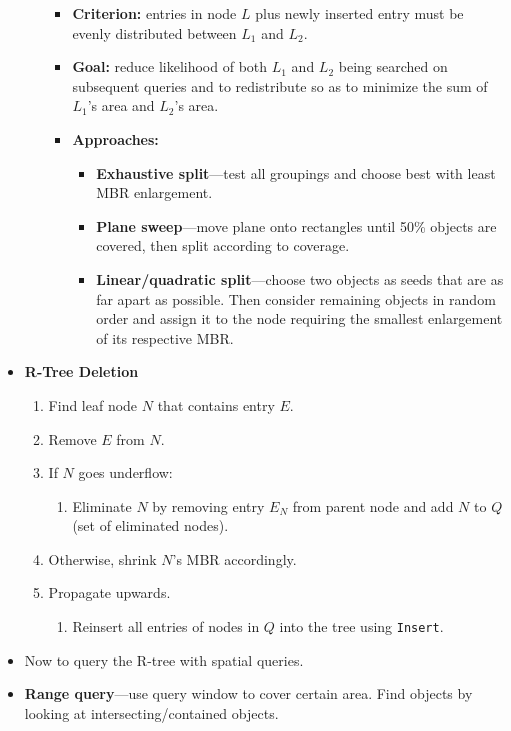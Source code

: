 \begin{multicols}{2}
\begin{itemize}
\begin{itemize}
    \begin{itemize}
        \item
      \textbf{Criterion:} entries in node \(L\) plus newly inserted
      entry must be evenly distributed between \(L_{1}\) and \(L_{2}\).
    \item
      \textbf{Goal:} reduce likelihood of both \(L_{1}\) and \(L_{2}\)
      being searched on subsequent queries and to redistribute so as to
      minimize the sum of \(L_{1}\)'s area and \(L_{2}\)'s area.
    \item
      \textbf{Approaches:}

      \begin{itemize}
            \item
        \textbf{Exhaustive split}---test all groupings and choose best
        with least MBR enlargement.
      \item
        \textbf{Plane sweep}---move plane onto rectangles until 50\%
        objects are covered, then split according to coverage.
      \item
        \textbf{Linear/quadratic split}---choose two objects as seeds
        that are as far apart as possible. Then consider remaining
        objects in random order and assign it to the node requiring the
        smallest enlargement of its respective MBR.
      \end{itemize}
    \end{itemize}
  \end{itemize}
\item
  \textbf{R-Tree Deletion}

  \begin{enumerate}
  \def\labelenumi{\arabic{enumi}.}
    \item
    Find leaf node \(N\) that contains entry \(E\).
  \item
    Remove \(E\) from \(N\).
  \item
    If \(N\) goes underflow:

    \begin{enumerate}
    \def\labelenumii{\arabic{enumii}.}
        \item
      Eliminate \(N\) by removing entry \(E_{N}\) from parent node and
      add \(N\) to \(Q\) (set of eliminated nodes).
    \end{enumerate}
  \item
    Otherwise, shrink \(N\)'s MBR accordingly.
  \item
    Propagate upwards.

    \begin{enumerate}
    \def\labelenumii{\arabic{enumii}.}
        \item
      Reinsert all entries of nodes in \(Q\) into the tree using
      \texttt{Insert}.
    \end{enumerate}
  \end{enumerate}
\item
  Now to query the R-tree with spatial queries.
\item
  \textbf{Range query}---use query window to cover certain area. Find
  objects by looking at intersecting/contained objects.


\end{itemize}
\end{multicols}
